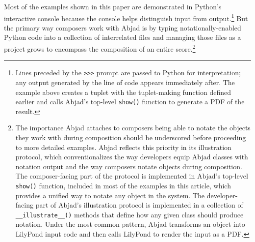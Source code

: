 \documentclass{article}
\begin{document}
\noindent Most of the examples shown in this paper are demonstrated in Python's
interactive console because the console helps distinguish input from output.\footnote{Lines preceded by the \texttt{>>>} prompt are passed to Python for interpretation; any output generated by the line of code appears immediately after. The example above creates a tuplet with the tuplet-making function defined earlier and calls Abjad's top-level \texttt{show()} function to generate a PDF of the result.} But the primary way composers work with Abjad is by typing notationally-enabled Python code into a collection of interrelated files and managing those files as a project grows to encompass the composition of an entire score.\footnote{The importance Abjad attaches to composers being able to notate the objects they work with during composition should be underscored before proceeding to more detailed examples. Abjad reflects this priority in its illustration protocol, which conventionalizes the way developers equip Abjad classes with
notation output and the way composers notate objects during
composition. The composer-facing part of the protocol is implemented in Abjad's
top-level \texttt{show()} function, included in most of the examples in this article, which provides a unified way to
notate any object in the system. The developer-facing part of Abjad's
illustration protocol is implemented in a collection of
\texttt{\_\_illustrate\_\_()} methods that define how any given class should produce notation. Under the
most common pattern, Abjad transforms an object into LilyPond input code and
then calls LilyPond to render the input as a PDF.}

\end{document}
